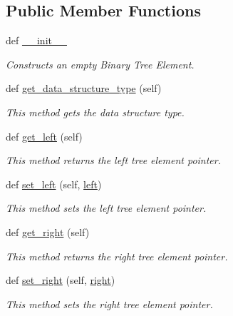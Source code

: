 \subsection*{Public Member Functions}
\begin{DoxyCompactItemize}
\item 
def \hyperlink{classbridges_1_1bin__tree__element_1_1_bin_tree_element_a8b246c45efa79208aab73069faecd976}{\+\_\+\+\_\+init\+\_\+\+\_\+}
\begin{DoxyCompactList}\small\item\em Constructs an empty Binary Tree Element. \end{DoxyCompactList}\item 
def \hyperlink{classbridges_1_1bin__tree__element_1_1_bin_tree_element_a974adfbdb569d77586ecf145197b448b}{get\+\_\+data\+\_\+structure\+\_\+type} (self)
\begin{DoxyCompactList}\small\item\em This method gets the data structure type. \end{DoxyCompactList}\item 
def \hyperlink{classbridges_1_1bin__tree__element_1_1_bin_tree_element_abe7b4ac109197c37f911ab3b5acafa7a}{get\+\_\+left} (self)
\begin{DoxyCompactList}\small\item\em This method returns the left tree element pointer. \end{DoxyCompactList}\item 
def \hyperlink{classbridges_1_1bin__tree__element_1_1_bin_tree_element_a51ad9f02aa22cc77dc254b3025cb82a6}{set\+\_\+left} (self, \hyperlink{classbridges_1_1bin__tree__element_1_1_bin_tree_element_aa3363fa417561642fe5c025465a284bc}{left})
\begin{DoxyCompactList}\small\item\em This method sets the left tree element pointer. \end{DoxyCompactList}\item 
def \hyperlink{classbridges_1_1bin__tree__element_1_1_bin_tree_element_ad97a28193cf670e61a5be6d221103cec}{get\+\_\+right} (self)
\begin{DoxyCompactList}\small\item\em This method returns the right tree element pointer. \end{DoxyCompactList}\item 
def \hyperlink{classbridges_1_1bin__tree__element_1_1_bin_tree_element_a9ffd3555d1ffcbd6692c3da53fad35d7}{set\+\_\+right} (self, \hyperlink{classbridges_1_1bin__tree__element_1_1_bin_tree_element_a1178847a9c2ea50957f0724e2552fa36}{right})
\begin{DoxyCompactList}\small\item\em This method sets the right tree element pointer. \end{DoxyCompactList}\end{DoxyCompactItemize}
